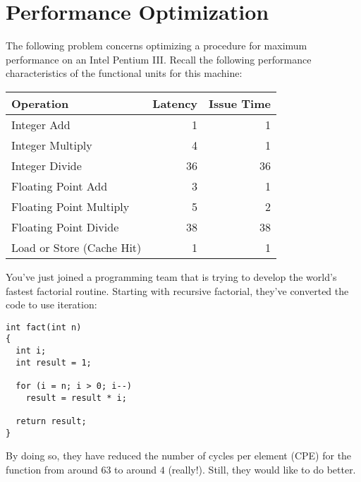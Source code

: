 \section*{Performance Optimization}

The following problem concerns optimizing a procedure for maximum
performance on an Intel Pentium III.  Recall the following performance
characteristics of the functional units for this machine:
\begin{center}
\begin{tabular}{|l|r|r|}
\hline
Operation & Latency & Issue Time \\
\hline
Integer Add & 1 & 1 \\
Integer Multiply & 4 & 1 \\
Integer Divide & 36 & 36 \\
Floating Point Add & 3 & 1 \\
Floating Point Multiply & 5 & 2 \\
Floating Point Divide & 38 & 38 \\
Load or Store (Cache Hit) & 1 & 1 \\
\hline
\end{tabular}
\end{center}

You've just joined a programming team that is trying to develop the
world's fastest factorial routine.
Starting with recursive factorial,
they've converted the code to use iteration:
\begin{verbatim}
int fact(int n)
{
  int i;
  int result = 1;

  for (i = n; i > 0; i--)
    result = result * i;

  return result;
}
\end{verbatim}
By doing so, they have reduced the number of cycles per element (CPE)
for the function from around $63$ to around $4$ (really!).
Still, they would
like to do better.

\newpage

